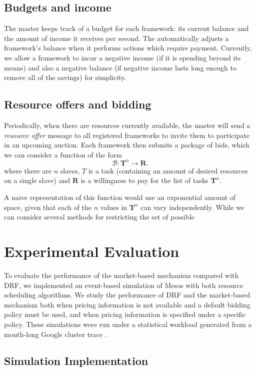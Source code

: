 \documentclass{acm_proc_article-sp}
\begin{document}
\subsection{Budgets and income}
The master keeps track of a budget for each framework: its current balance and
the amount of income it receives per second. The automatically adjusts a
framework's balance when it performs actions which require payment. Currently,
we allow a framework to incur a negative income (if it is spending beyond its
means) and also a negative balance (if negative income lasts long enough to
remove all of the savings) for simplicity.

\subsection{Resource offers and bidding}
Periodically, when there are resources currently available, the master will
send a \emph{resource offer} message to all registered frameworks to invite them
to participate in an upcoming auction. Each framework then submits a package of
bids, which we can consider a function of the form
\[ \mathcal{B}: \mathbf{T}^n \rightarrow \mathbf{R}. \]
where there are $n$ slaves, $T$ is a task (containing an amount of desired
resources on a single slave) and $\mathbf{R}$ is a willingness to pay for the
list of tasks $\mathbf{T}^n$.

A naive representation of this function would use an exponential amount of
space, given that each of the $n$ values in $\mathbf{T}^n$ can vary
independently. While we can consider several methods for restricting the set of
possible 

\section{Experimental Evaluation}
\label{sec:eval}

To evaluate the performance of the market-based mechanism compared with DRF,
we implemented an event-based simulation of Mesos with both resource scheduling algorithms.
We study the performance of DRF and the market-based mechanism both when pricing information is not available and a default bidding policy must be used, and when pricing information is specified under a specific policy. These simulations were run under a statistical workload generated from a month-long Google cluster trace \cite{TODO}.

\subsection{Simulation Implementation\\}
\end{document}
